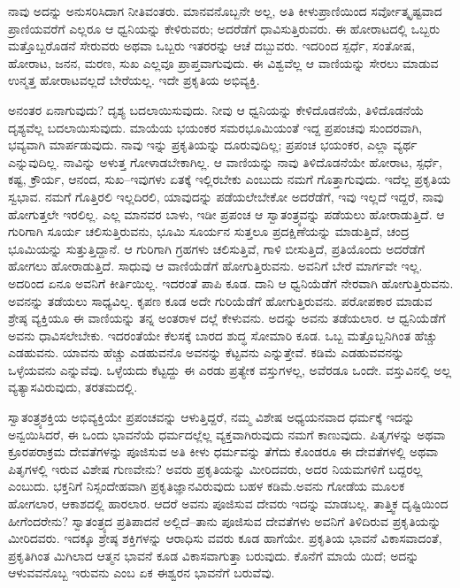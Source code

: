 ನಾವು ಅದನ್ನು ಅನುಸರಿಸಿದಾಗ ನೀತಿವಂತರು. ಮಾನವನೊಬ್ಬನೇ ಅಲ್ಲ, ಅತಿ ಕೀಳುಪ್ರಾಣಿಯಿಂದ ಸರ್ವೋತ್ಕೃಷ್ಟವಾದ ಪ್ರಾಣಿಯವರೆಗೆ ಎಲ್ಲರೂ ಆ ಧ್ವನಿಯನ್ನು ಕೇಳಿರುವರು; ಅದರೆಡೆಗೆ ಧಾವಿಸುತ್ತಿರುವರು. ಈ ಹೋರಾಟದಲ್ಲಿ ಒಬ್ಬರು ಮತ್ತೊಬ್ಬರೊಡನೆ ಸೇರುವರು ಅಥವಾ ಒಬ್ಬರು ಇತರರನ್ನು ಆಚೆ ದಬ್ಬುವರು. ಇದರಿಂದ ಸ್ಪರ್ಧೆ, ಸಂತೋಷ, ಹೋರಾಟ, ಜನನ, ಮರಣ, ಸುಖ ಎಲ್ಲವೂ ಪ್ರಾಪ್ತವಾಗುವುದು. ಈ ವಿಶ್ವವೆಲ್ಲ ಆ ವಾಣಿಯನ್ನು ಸೇರಲು ಮಾಡುವ ಉನ್ಮತ್ತ ಹೋರಾಟವಲ್ಲದೆ ಬೇರೆಯಲ್ಲ. ಇದೇ ಪ್ರಕೃತಿಯ ಅಭಿವ್ಯಕ್ತಿ.

ಅನಂತರ ಏನಾಗುವುದು? ದೃಶ್ಯ ಬದಲಾಯಿಸುವುದು. ನೀವು ಆ ಧ್ವನಿಯನ್ನು ಕೇಳಿದೊಡನೆಯೆ, ತಿಳಿದೊಡನೆಯೆ ದೃಶ್ಯವೆಲ್ಲ ಬದಲಾಯಿಸುವುದು. ಮಾಯೆಯ ಭಯಂಕರ ಸಮರಭೂಮಿಯಂತೆ ಇದ್ದ ಪ್ರಪಂಚವು ಸುಂದರವಾಗಿ, ಭವ್ಯವಾಗಿ ಮಾರ್ಪಡುವುದು. ನಾವು ಇನ್ನು ಪ್ರಕೃತಿಯನ್ನು ದೂರುವುದಿಲ್ಲ; ಪ್ರಪಂಚ ಭಯಂಕರ, ಎಲ್ಲಾ ವ್ಯರ್ಥ ಎನ್ನುವುದಿಲ್ಲ. ನಾವಿನ್ನು ಅಳುತ್ತ ಗೋಳಾಡಬೇಕಾಗಿಲ್ಲ. ಆ ವಾಣಿಯನ್ನು ನಾವು ತಿಳಿದೊಡನೆಯೇ ಹೋರಾಟ, ಸ್ಪರ್ಧೆ, ಕಷ್ಟ, ಕ್ರೌರ್ಯ, ಆನಂದ, ಸುಖ–ಇವುಗಳು ಏತಕ್ಕೆ ಇಲ್ಲಿರಬೇಕು ಎಂಬುದು ನಮಗೆ ಗೊತ್ತಾಗುವುದು. ಇದೆಲ್ಲ ಪ್ರಕೃತಿಯ ಸ್ವಭಾವ. ನಮಗೆ ಗೊತ್ತಿರಲಿ ಇಲ್ಲದಿರಲಿ, ಯಾವುದನ್ನು ಪಡೆಯಲೇಬೇಕೋ ಅದರೆಡೆಗೆ, ಇವು ಇಲ್ಲದೆ ಇದ್ದರೆ, ನಾವು ಹೋಗುತ್ತಲೇ ಇರಲಿಲ್ಲ. ಎಲ್ಲ ಮಾನವರ ಬಾಳು, ಇಡೀ ಪ್ರಪಂಚ ಆ ಸ್ವಾತಂತ್ರ್ಯವನ್ನು ಪಡೆಯಲು ಹೋರಾಡುತ್ತಿದೆ. ಆ ಗುರಿಗಾಗಿ ಸೂರ್ಯ ಚಲಿಸುತ್ತಿರುವನು, ಭೂಮಿ ಸೂರ್ಯನ ಸುತ್ತಲೂ ಪ್ರದಕ್ಷಿಣೆಯನ್ನು ಮಾಡುತ್ತಿದೆ, ಚಂದ್ರ ಭೂಮಿಯನ್ನು ಸುತ್ತುತ್ತಿದ್ದಾನೆ. ಆ ಗುರಿಗಾಗಿ ಗ್ರಹಗಳು ಚಲಿಸುತ್ತಿವೆ, ಗಾಳಿ ಬೀಸುತ್ತಿದೆ, ಪ್ರತಿಯೊಂದು ಅದರೆಡೆಗೆ ಹೋಗಲು ಹೋರಾಡುತ್ತಿದೆ. ಸಾಧುವು ಆ ವಾಣಿಯೆಡೆಗೆ ಹೋಗುತ್ತಿರುವನು. ಅವನಿಗೆ ಬೇರೆ ಮಾರ್ಗವೇ ಇಲ್ಲ. ಅದರಿಂದ ಏನೂ ಅವನಿಗೆ ಕೀರ್ತಿಯಿಲ್ಲ. ಇದರಂತೆ ಪಾಪಿ ಕೂಡ. ದಾನಿ ಆ ಧ್ವನಿಯೆಡೆಗೆ ನೇರವಾಗಿ ಹೋಗುತ್ತಿರುವನು. ಅವನನ್ನು ತಡೆಯಲು ಸಾಧ್ಯವಿಲ್ಲ. ಕೃಪಣ ಕೂಡ ಅದೇ ಗುರಿಯೆಡೆಗೆ ಹೋಗುತ್ತಿರುವನು. ಪರೋಪಕಾರ ಮಾಡುವ ಶ್ರೇಷ್ಠ ವ್ಯಕ್ತಿಯೂ ಈ ವಾಣಿಯನ್ನು ತನ್ನ ಅಂತರಾಳ ದಲ್ಲೆ ಕೇಳುವನು. ಅದನ್ನು ಅವನು ತಡೆಯಲಾರ. ಆ ಧ್ವನಿಯೆಡೆಗೆ ಅವನು ಧಾವಿಸಲೇಬೇಕು. ಇದರಂತೆಯೇ ಕೆಲಸಕ್ಕೆ ಬಾರದ ಶುದ್ಧ ಸೋಮಾರಿ ಕೂಡ. ಒಬ್ಬ ಮತ್ತೊಬ್ಬನಿಗಿಂತ ಹೆಚ್ಚು ಎಡಹುವನು. ಯಾವನು ಹೆಚ್ಚು ಎಡಹುವನೊ ಅವನನ್ನು ಕೆಟ್ಟವನು ಎನ್ನುತ್ತೇವೆ. ಕಡಿಮೆ ಎಡಹುವವನನ್ನು ಒಳ್ಳೆಯವನು ಎನ್ನುವೆವು. ಒಳ್ಳೆಯದು ಕೆಟ್ಟದ್ದು ಈ ಎರಡು ಪ್ರತ್ಯೇಕ ವಸ್ತುಗಳಲ್ಲ, ಅವೆರಡೂ ಒಂದೇ. ವಸ್ತುವಿನಲ್ಲಿ ಅಲ್ಲ ವ್ಯತ್ಯಾಸವಿರುವುದು, ತರತಮದಲ್ಲಿ.

ಸ್ವಾತಂತ್ರ್ಯಶಕ್ತಿಯ ಅಭಿವ್ಯಕ್ತಿಯೇ ಪ್ರಪಂಚವನ್ನು ಆಳುತ್ತಿದ್ದರೆ, ನಮ್ಮ ವಿಶೇಷ ಅಧ್ಯಯನವಾದ ಧರ್ಮಕ್ಕೆ ಇದನ್ನು ಅನ್ವಯಿಸಿದರೆ, ಈ ಒಂದು ಭಾವನೆಯೆ ಧರ್ಮದಲ್ಲೆಲ್ಲ ವ್ಯಕ್ತವಾಗಿರುವುದು ನಮಗೆ ಕಾಣುವುದು. ಪಿತೃಗಳನ್ನು ಅಥವಾ ಕ್ರೂರಪರಾಕ್ರಮ ದೇವತೆಗಳನ್ನು ಪೂಜಿಸುವ ಅತಿ ಕೀಳು ಧರ್ಮವನ್ನು ತೆಗೆದು ಕೊಂಡರೂ ಈ ದೇವತೆಗಳಲ್ಲಿ ಅಥವಾ ಪಿತೃಗಳಲ್ಲಿ ಇರುವ ವಿಶೇಷ ಗುಣವೇನು? ಅವರು ಪ್ರಕೃತಿಯನ್ನು ಮೀರಿದವರು, ಅದರ ನಿಯಮಗಳಿಗೆ ಬದ್ದರಲ್ಲ ಎಂಬುದು. ಭಕ್ತನಿಗೆ ನಿಸ್ಸಂದೇಹವಾಗಿ ಪ್ರಕೃತಿಜ್ಞಾನವಿರುವುದು ಬಹಳ ಕಡಿಮೆ.ಅವನು ಗೋಡೆಯ ಮೂಲಕ ಹೋಗಲಾರ, ಆಕಾಶದಲ್ಲಿ ಹಾರಲಾರ. ಆದರೆ ಅವನು ಪೂಜಿಸುವ ದೇವರು ಇದನ್ನು ಮಾಡಬಲ್ಲ. ತಾತ್ತ್ವಿಕ ದೃಷ್ಟಿಯಿಂದ ಹೀಗೆಂದರೇನು? ಸ್ವಾತಂತ್ರ್ಯದ ಪ್ರತಿಪಾದನೆ ಅಲ್ಲಿದೆ–ತಾನು ಪೂಜಿಸುವ ದೇವತೆಗಳು ಅವನಿಗೆ ತಿಳಿದಿರುವ ಪ್ರಕೃತಿಯನ್ನು ಮೀರಿದವರು. ಇದಕ್ಕೂ ಶ್ರೇಷ್ಠ ಶಕ್ತಿಗಳನ್ನು ಆರಾಧಿಸು ವವರು ಕೂಡ ಹಾಗೆಯೇ. ಪ್ರಕೃತಿಯ ಭಾವನೆ ವಿಕಾಸವಾದಂತೆ, ಪ್ರಕೃತಿಗಿಂತ ಮಿಗಿಲಾದ ಆತ್ಮನ ಭಾವನೆ ಕೂಡ ವಿಕಾಸವಾಗುತ್ತಾ ಬರುವುದು. ಕೊನೆಗೆ ಮಾಯೆ ಯಿದೆ; ಅದನ್ನು ಆಳುವವನೊಬ್ಬ ಇರುವನು ಎಂಬ ಏಕ ಈಶ್ವರನ ಭಾವನೆಗೆ ಬರುವೆವು.

